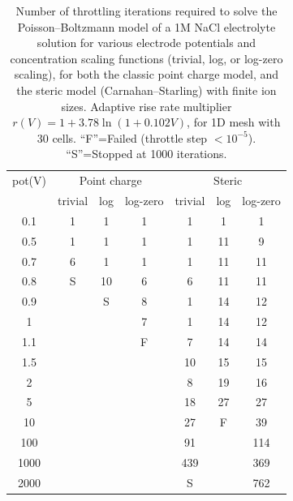 \begin{table}
  \centering
  \begin{tabular}{c|ccc|ccc}
pot(V)  & \multicolumn{3}{c|}{Point charge} & \multicolumn{3}{c}{Steric}    \\
        & trivial & log & log-zero & trivial & log & log-zero \\ \hline
0.1	&1	&1	&1	&1	&1	&1\\
0.5	&1	&1	&1	&1	&11	&9\\
0.7	&6	&1	&1	&1	&11	&11\\
0.8	&S	&10	&6	&6	&11	&11\\
0.9	&	&S	&8	&1	&14	&12\\
1	&	&	&7	&1	&14	&12\\
1.1	&	&	&F	&7	&14	&14\\
1.5	&	&	&	&10	&15	&15\\
2	&	&	&	&8	&19	&16\\
5	&	&	&	&18	&27	&27\\
10	&	&	&	&27	&F	&39\\
100	&	&	&	&91	&	&114\\
1000	&	&	&	&439	&	&369    \\
2000	&	&	&	&S	&	&762    
  \end{tabular}
\caption{\label{tab:convergence}Number of throttling iterations
  required to  solve the Poisson--Boltzmann model of a 1M NaCl electrolyte solution
  for various electrode potentials and concentration scaling
  functions (trivial, log, or log-zero scaling), for both the classic point charge model, and the steric
  model (Carnahan--Starling) with finite ion sizes. Adaptive rise rate
  multiplier $r(V)=1+3.78\ln(1+0.102V)$, for 1D mesh with 30 cells. 
  ``F''=Failed
  (throttle step $<10^{-5}$). ``S''=Stopped at 1000 iterations.}
\end{table}


